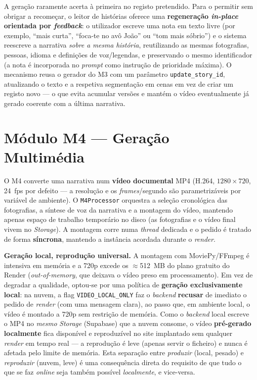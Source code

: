 A geração raramente acerta à primeira no registo pretendido. Para o permitir sem obrigar a recomeçar, o leitor
de histórias oferece uma
\textbf{regeneração \emph{in-place} orientada por \emph{feedback}}: o
utilizador escreve uma nota em texto livre (por exemplo, ``mais curta'',
``foca-te no avô João'' ou ``tom mais sóbrio'') e o sistema reescreve a
narrativa \emph{sobre a mesma história}, reutilizando as mesmas
fotografias, pessoas, idioma e definições de voz/legendas, e preservando o
mesmo identificador (a nota é incorporada no \emph{prompt} como instrução
de prioridade máxima). O mecanismo reusa o gerador do M3 com um parâmetro
\texttt{update\_story\_id}, atualizando o texto e a respetiva segmentação
em cenas em vez de criar um registo novo --- o que evita acumular versões
e mantém o vídeo eventualmente já gerado coerente com a última narrativa.

\section{Módulo M4 --- Geração Multimédia}
\label{sec:impl_m4}

O M4 converte uma narrativa num \textbf{vídeo documental} MP4 (H.264,
$1280\times720$, 24~fps por defeito --- a resolução e os \emph{frames}/segundo
são parametrizáveis por variável de ambiente). O \texttt{M4Processor} orquestra
a seleção cronológica das fotografias, a síntese de voz da narrativa e a
montagem do vídeo, mantendo apenas espaço de trabalho temporário no disco (as
fotografias e o vídeo final vivem no \emph{Storage}). A montagem corre numa
\emph{thread} dedicada e o pedido é tratado de forma \textbf{síncrona}, mantendo
a instância acordada durante o \emph{render}.

\textbf{Geração local, reprodução universal.} A montagem com MoviePy/FFmpeg
é intensiva em memória e a 720p excede os $\approx$512~MB do plano gratuito do
Render (\emph{out-of-memory}, que deixava o vídeo preso em processamento). Em
vez de degradar a qualidade, optou-se por uma política de \textbf{geração
exclusivamente local}: na nuvem, a flag \texttt{VIDEO\_LOCAL\_ONLY} faz o
\emph{backend} \textbf{recusar} de imediato o pedido de \emph{render} (com uma
mensagem clara), ao passo que, em ambiente local, o vídeo é montado a 720p sem
restrição de memória. Como o \emph{backend} local escreve o MP4 no \emph{mesmo}
\emph{Storage} (Supabase) que a nuvem consome, o vídeo \textbf{pré-gerado
localmente} fica disponível e reproduzível no site implantado sem qualquer
\emph{render} em tempo real --- a reprodução é leve (apenas servir o ficheiro) e
nunca é afetada pelo limite de memória. Esta separação entre \emph{produzir}
(local, pesado) e \emph{reproduzir} (nuvem, leve) é uma consequência direta do
requisito de que tudo o que se faz \emph{online} seja também possível
\emph{localmente}, e vice-versa.

